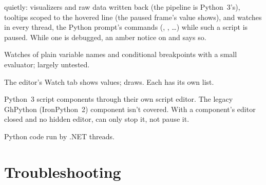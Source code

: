 \begin{description}
        quietly: visualizers and raw data written back (the pipeline is Python~3's), tooltips scoped to the hovered line
        (the paused frame's value shows),  and watches in every thread, the Python prompt's commands
        (, , …) while such a script is paused. While one is debugged, an amber notice on 
        and  says so.
  \item[C\#:] Watches of plain variable names and conditional breakpoints with a small evaluator; largely untested.
  \item[Two watch lists.] The editor's Watch tab shows values;  draws. Each has its own list.
  \item[Grasshopper:] Python~3 script components through their own script editor. The legacy GhPython (IronPython~2)
        component isn't covered. With a component's editor closed and no hidden editor,  can only stop it,
        not pause it.
  \item[Not traced:] Python code run by .NET threads.
\end{description}

\section{Troubleshooting}

